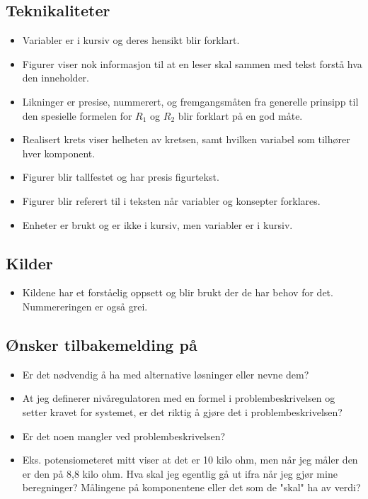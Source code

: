 \documentclass[a4paper,11pt,norsk]{article}
\begin{document}
\subsection{Teknikaliteter}
\begin{itemize}
    \item Variabler er i kursiv og deres hensikt blir forklart.
    \item Figurer viser nok informasjon til at en leser skal sammen med tekst forstå hva den inneholder. 
    \item Likninger er presise, nummerert, og fremgangsmåten fra generelle prinsipp til den spesielle formelen for $R_1$ og $R_2$ blir forklart på en god måte.
    \item Realisert krets viser helheten av kretsen, samt hvilken variabel som tilhører hver komponent.
    \item Figurer blir tallfestet og har presis figurtekst.
    \item Figurer blir referert til i teksten når variabler og konsepter forklares.
    \item Enheter er brukt og er ikke i kursiv, men variabler er i kursiv.
\end{itemize}



\subsection{Kilder}
\begin{itemize}
    \item Kildene har et forståelig oppsett og blir brukt der de har behov for det. Nummereringen er også grei.
\end{itemize}

\subsection{Ønsker tilbakemelding på}
\begin{itemize}
    \item Er det nødvendig å ha med alternative løsninger eller nevne dem?
    \item At jeg definerer nivåregulatoren med en formel i problembeskrivelsen og setter kravet for systemet, er det riktig å gjøre det i problembeskrivelsen?
    \item Er det noen mangler ved problembeskrivelsen?
    \item Eks. potensiometeret mitt viser at det er 10 kilo ohm, men når jeg måler den er den på 8,8 kilo ohm. Hva skal jeg egentlig gå ut ifra når jeg gjør mine beregninger? Målingene på komponentene eller det som de "skal" ha av verdi?
\end{itemize}
\newpage
\end{document}
